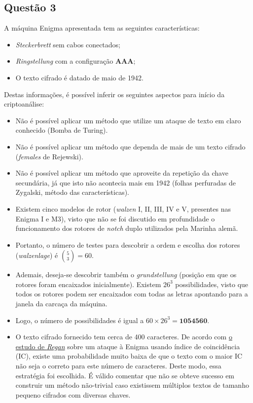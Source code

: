 \documentclass{article}
\begin{document}
\subsection*{Questão 3}
A máquina Enigma apresentada tem as seguintes características:
\begin{itemize}
    \item \textit{Steckerbrett} sem cabos conectados;
    \item \textit{Ringstellung} com a configuração \textbf{AAA};
    \item O texto cifrado é datado de maio de 1942.
\end{itemize}
Destas informações, é possível inferir os seguintes aspectos para início da criptoanálise:
\begin{itemize}
    \item Não é possível aplicar um método que utilize um ataque de texto em claro conhecido (Bomba de Turing).
    \item Não é possível aplicar um método que dependa de mais de um texto cifrado (\textit{females} de Rejewski).
    \item Não é possível aplicar um método que aproveite da repetição da chave secundária, já que isto não acontecia mais em 1942 (folhas perfuradas de Zygalski, método das características).
    \item Existem cinco modelos de rotor (\textit{walzen} I, II, III, IV e V, presentes nas Enigma I e M3), visto que não se foi discutido em profundidade o funcionamento dos rotores de \textit{notch} duplo utilizados pela Marinha alemã.
    \item Portanto, o número de testes para descobrir a ordem e escolha dos rotores (\textit{walzenlage}) é $\binom{5}{3} = 60$.
    \item Ademais, deseja-se descobrir também o \textit{grundstellung} (posição em que os rotores foram encaixados inicialmente). Existem $26^3$ possibilidades, visto que todos os rotores podem ser encaixados com todas as letras apontando para a janela da carcaça da máquina.
    \item Logo, o número de possibilidades é igual a $60 \times 26^3 = \textbf{1054560}$.
    \item O texto cifrado fornecido tem cerca de 400 caracteres. De acordo com \href{http://www.cs.rochester.edu/u/brown/Crypto/studprojs/Enigma.html}{o estudo de \textit{Regan}} sobre um ataque à Enigma usando índice de coincidência (IC), existe uma probabilidade muito baixa de que o texto com o maior IC não seja o correto para este número de caracteres. Deste modo, essa estratégia foi escolhida. É válido comentar que não se obteve sucesso em construir um método não-trivial caso existissem múltiplos textos de tamanho pequeno cifrados com diversas chaves.
\end{itemize}
\end{document}
